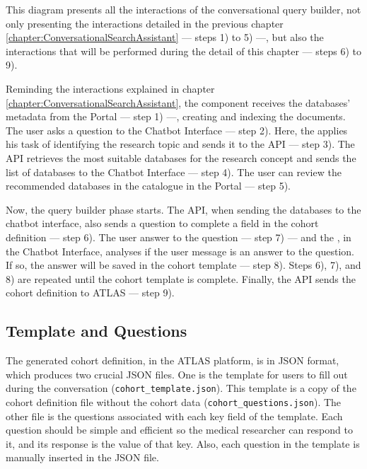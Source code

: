 This diagram presents all the interactions of the conversational query builder, not only presenting the interactions detailed in the previous chapter \ref{chapter:ConversationalSearchAssistant} — steps 1) to 5) —, but also the interactions that will be performed during the detail of this chapter — steps 6) to 9).

Reminding the interactions explained in chapter \ref{chapter:ConversationalSearchAssistant}, the {\ir} component receives the databases' metadata from the {\ehden} Portal — step 1) —, creating and indexing the documents. The user asks a question to the Chatbot Interface — step 2). Here, the {\llm} applies his task of identifying the research topic and sends it to the {\ir} API — step 3). The {\ir} API retrieves the most suitable databases for the research concept and sends the list of databases to the Chatbot Interface — step 4). The user can review the recommended databases in the catalogue in the {\ehden} Portal — step 5). 

Now, the query builder phase starts. The {\ir} API, when sending the databases to the chatbot interface, also sends a question to complete a field in the cohort definition — step 6). The user answer to the question — step 7) — and the {\llm}, in the Chatbot Interface, analyses if the user message is an answer to the question. If so, the answer will be saved in the cohort template — step 8). Steps 6), 7), and 8) are repeated until the cohort template is complete. Finally, the {\ir} API sends the cohort definition to ATLAS — step 9).



\subsection{Template and Questions}

The generated cohort definition, in the ATLAS platform, is in JSON format, which produces two crucial JSON files. One is the template for users to fill out during the conversation {\small\normalfont(\texttt{cohort\_template.json})}. This template is a copy of the cohort definition file without the cohort data {\small\normalfont(\texttt{cohort\_questions.json})}. The other file is the questions associated with each key field of the template. Each question should be simple and efficient so the medical researcher can respond to it, and its response is the value of that key. Also, each question in the template is manually inserted in the JSON file.  



